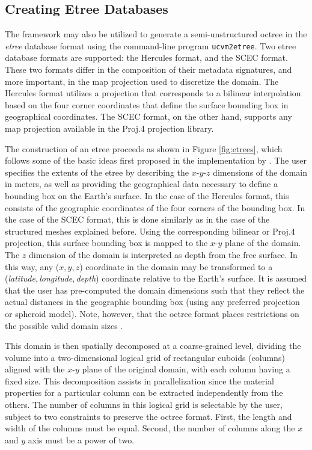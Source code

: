 


\subsection{Creating Etree Databases}

The framework may also be utilized to generate a semi-unstructured octree in the \textit{etree} database format \citep{Tu_2003_Tech} using the command-line program \texttt{ucvm2etree}. Two etree database formats are supported: the Hercules format, and the SCEC format. These two formats differ in the composition of their metadata signatures, and more important, in the map projection used to discretize the domain. The Hercules format utilizes a projection that corresponds to a bilinear interpolation based on the four corner coordinates that define the surface bounding box in geographical coordinates. The SCEC format, on the other hand, supports any map projection available in the Proj.4 projection library.

The construction of an etree proceeds as shown in Figure \ref{fig:etrees}, which follows some of the basic ideas first proposed in the implementation by \citet{Taborda_2007_Proc}. The user specifies the extents of the etree by describing the $x$-$y$-$z$ dimensions of the domain in meters, as well as providing the geographical data necessary to define a bounding box on the Earth's surface. In the case of the Hercules format, this consists of the geographic coordinates of the four corners of the bounding box. In the case of the SCEC format, this is done similarly as in the case of the structured meshes explained before. Using the corresponding bilinear or Proj.4 projection, this surface bounding box is mapped to the $x$-$y$ plane of the domain. The $z$ dimension of the domain is interpreted as depth from the free surface. In this way, any ($x,y,z$) coordinate in the domain may be transformed to a (\textit{latitude},\,\textit{longitude},\,\textit{depth}) coordinate relative to the Earth's surface. It is assumed that the user has pre-computed the domain dimensions such that they reflect the actual distances in the geographic bounding box (using any preferred projection or spheroid model). Note, however, that the octree format places restrictions on the possible valid domain sizes \citep{Tu_2003_Tech, Taborda_2007_Proc}.

This domain is then spatially decomposed at a coarse-grained level, dividing the volume into a two-dimensional logical grid of rectangular cuboids (columns) aligned with the $x$-$y$ plane of the original domain, with each column having a fixed size. This decomposition assists in parallelization since the material properties for a particular column can be extracted independently from the others. The number of columns in this logical grid is selectable by the user, subject to two constraints to preserve the octree format. First, the length and width of the columns must be equal. Second, the number of columns along the $x$ and $y$ axis must be a power of two.

